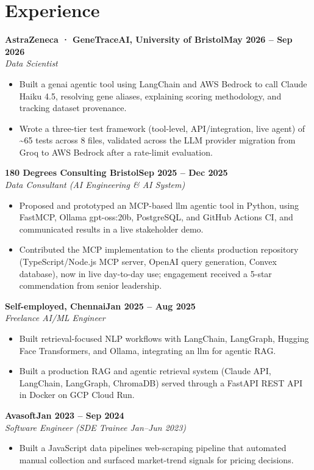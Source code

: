 \documentclass[a4paper,10pt]{article}
\newcommand{\entry}[4]{\noindent\textbf{#1}\hfill\textbf{#2}\\ \textit{#3}\hfill\textit{#4}\par}
\begin{document}
\section{Experience}
\entry{AstraZeneca · GeneTraceAI, University of Bristol}{May 2026 – Sep 2026}{Data Scientist}{}
\begin{itemize}
  \item Built a genai agentic tool using LangChain and AWS Bedrock to call Claude Haiku 4.5, resolving gene aliases, explaining scoring methodology, and tracking dataset provenance.
  \item Wrote a three-tier test framework (tool-level, API/integration, live agent) of \textasciitilde{}65 tests across 8 files, validated across the LLM provider migration from Groq to AWS Bedrock after a rate-limit evaluation.
\end{itemize}
\vspace{3pt}
\entry{180 Degrees Consulting Bristol}{Sep 2025 – Dec 2025}{Data Consultant (AI Engineering \& AI System)}{}
\begin{itemize}
  \item Proposed and prototyped an MCP-based llm agentic tool in Python, using FastMCP, Ollama gpt-oss:20b, PostgreSQL, and GitHub Actions CI, and communicated results in a live stakeholder demo.
  \item Contributed the MCP implementation to the client\textquotesingle{}s production repository (TypeScript/Node.js MCP server, OpenAI query generation, Convex database), now in live day-to-day use; engagement received a 5-star commendation from senior leadership.
\end{itemize}
\vspace{3pt}
\entry{Self-employed, Chennai}{Jan 2025 – Aug 2025}{Freelance AI/ML Engineer}{}
\begin{itemize}
  \item Built retrieval-focused NLP workflows with LangChain, LangGraph, Hugging Face Transformers, and Ollama, integrating an llm for agentic RAG.
  \item Built a production RAG and agentic retrieval system (Claude API, LangChain, LangGraph, ChromaDB) served through a FastAPI REST API in Docker on GCP Cloud Run.
\end{itemize}
\vspace{3pt}
\entry{Avasoft}{Jan 2023 – Sep 2024}{Software Engineer (SDE Trainee Jan–Jun 2023)}{}
\begin{itemize}
  \item Built a JavaScript data pipelines web-scraping pipeline that automated manual collection and surfaced market-trend signals for pricing decisions.
\end{itemize}
\end{document}
